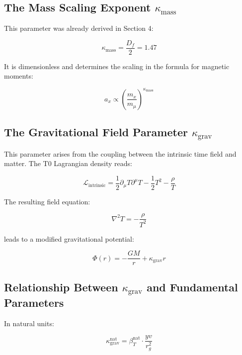 	\subsection{The Mass Scaling Exponent $\kappa_{\text{mass}}$}
	
	This parameter was already derived in Section 4:
	
	\begin{equation}
		\kappa_{\text{mass}} = \frac{D_f}{2} = 1.47
	\end{equation}
	
	It is dimensionless and determines the scaling in the formula for magnetic moments:
	
	\begin{equation}
		a_x \propto \left(\frac{m_x}{m_\mu}\right)^{\kappa_{\text{mass}}}
	\end{equation}
	
	\subsection{The Gravitational Field Parameter $\kappa_{\text{grav}}$}
	
	This parameter arises from the coupling between the intrinsic time field and matter. The T0 Lagrangian density reads:
	
	\begin{equation}
		\mathcal{L}_{\text{intrinsic}} = \frac{1}{2}\partial_\mu T \partial^\mu T - \frac{1}{2}T^2 - \frac{\rho}{T}
	\end{equation}
	
	The resulting field equation:
	
	\begin{equation}
		\nabla^2 T = -\frac{\rho}{T^2}
	\end{equation}
	
	leads to a modified gravitational potential:
	
	\begin{equation}
		\Phi(r) = -\frac{GM}{r} + \kappa_{\text{grav}} r
	\end{equation}
	
	\subsection{Relationship Between $\kappa_{\text{grav}}$ and Fundamental Parameters}
	
	In natural units:
	
	\begin{equation}
		\kappa_{\text{grav}}^{\text{nat}} = \beta_T^{\text{nat}} \cdot \frac{yv}{r_g^2}
	\end{equation}
	
